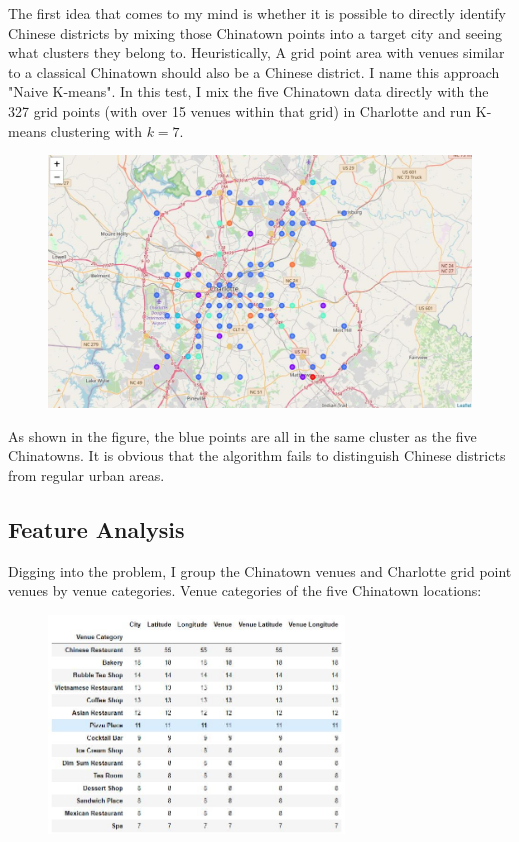 \documentclass{article}
\begin{document}
The first idea that comes to my mind is whether it is possible to directly identify Chinese districts by mixing those Chinatown points into a target city and seeing what clusters they belong to.
Heuristically, A grid point area with venues similar to a classical Chinatown should also be a Chinese district.
I name this approach "Naive K-means".
In this test, I mix the five Chinatown data directly with the 327 grid points (with over 15 venues within that grid) in Charlotte and run K-means clustering with $k=7$.

\begin{figure}[h!]
\includegraphics[width=1.0\textwidth]{cn1.jpg}
\centering
\end{figure}

As shown in the figure, the blue points are all in the same cluster as the five Chinatowns.
It is obvious that the algorithm fails to distinguish Chinese districts from regular urban areas.

\newpage

\subsection{Feature Analysis}

Digging into the problem, I group the Chinatown venues and Charlotte grid point venues by venue categories.
Venue categories of the five Chinatown locations:
\begin{figure}[h!]
\includegraphics[width=0.7\textwidth]{csp1.jpg}
\centering
\end{figure}
\end{document}
